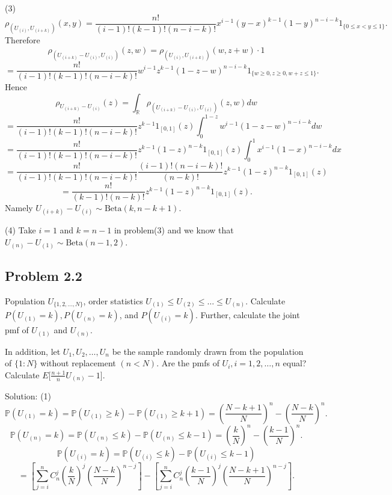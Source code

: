 (3)
\[
\rho_{(U_{(i)},U_{(i+k)})}(x,y)=\frac{n!}{(i-1)!(k-1)!(n-i-k)!}x^{i-1}(y-x)^{k-1}(1-y)^{n-i-k}1_{\{0\leq x<y\leq 1\}}.
\]
Therefore
\[
\rho_{(U_{(i+k)}-U_{(i)},U_{(i)})}(z,w)=\rho_{(U_{(i)},U_{(i+k)})}(w,z+w)\cdot 1
\]
\[
=\frac{n!}{(i-1)!(k-1)!(n-i-k)!}w^{i-1}z^{k-1}(1-z-w)^{n-i-k}1_{\{w\geq 0,z\geq 0,w+z\leq 1\}}.
\]
Hence
\[
\rho_{U_{(i+k)}-U_{(i)}}(z)=\int_{\mathbb{R}}\rho_{(U_{(i+k)}-U_{(i)},U_{(i)})}(z,w)dw
\]
\[
=\frac{n!}{(i-1)!(k-1)!(n-i-k)!}z^{k-1}1_{[0,1]}(z)\int_{0}^{1-z}w^{i-1}(1-z-w)^{n-i-k}dw
\]
\[
=\frac{n!}{(i-1)!(k-1)!(n-i-k)!}z^{k-1}(1-z)^{n-k}1_{[0,1]}(z)\int_{0}^{1}x^{i-1}(1-x)^{n-i-k}dx
\]
\[
=\frac{n!}{(i-1)!(k-1)!(n-i-k)!}\frac{(i-1)!(n-i-k)!}{(n-k)!}z^{k-1}(1-z)^{n-k}1_{[0,1]}(z)
\]
\[
=\frac{n!}{(k-1)!(n-k)!}z^{k-1}(1-z)^{n-k}1_{[0,1]}(z).
\]
Namely $U_{(i+k)}-U_{(i)}\sim\text{Beta}(k,n-k+1)$.

(4) Take $i=1$ and $k=n-1$ in problem(3) and we know that $U_{(n)}-U_{(1)}\sim\text{Beta}(n-1,2)$.

\subsection*{Problem 2.2}
Population $U_{\{1,2,\dots,N\}}$, order statistics $U_{(1)}\leq U_{(2)}\leq\dots\leq U_{(n)}$. Calculate $P(U_{(1)}=k),P(U_{(n)}=k)$, and $P(U_{(i)}=k)$. Further, calculate the joint pmf of $U_{(1)}$ and $U_{(n)}$.

In addition, let $U_{1},U_{2},\dots,U_{n}$ be the sample randomly drawn from the population of $\{1:N\}$ without replacement $(n<N)$. Are the pmfs of $U_{i},i=1,2,\dots,n$ equal? Calculate $E\big[\frac{n+1}{n}U_{(n)}-1\big]$.

{Solution:}
(1)
\[
\mathbb{P}\left(U_{(1)}=k\right)=\mathbb{P}\left(U_{(1)}\geq k\right)-\mathbb{P}\left(U_{(1)}\geq k+1\right)=\left(\frac{N-k+1}{N}\right)^{n}-\left(\frac{N-k}{N}\right)^{n}.
\]
\[
\mathbb{P}\left(U_{(n)}=k\right)=\mathbb{P}\left(U_{(n)}\leq k\right)-\mathbb{P}\left(U_{(n)}\leq k-1\right)=\left(\frac{k}{N}\right)^{n}-\left(\frac{k-1}{N}\right)^{n}.
\]
\[
\mathbb{P}\left(U_{(i)}=k\right)=\mathbb{P}\left(U_{(i)}\leq k\right)-\mathbb{P}\left(U_{(i)}\leq k-1\right)
\]
\[
=\left[\sum_{j=i}^{n}C_{n}^{j}\left(\frac{k}{N}\right)^{j}\left(\frac{N-k}{N}\right)^{n-j}\right]-\left[\sum_{j=i}^{n}C_{n}^{j}\left(\frac{k-1}{N}\right)^{j}\left(\frac{N-k+1}{N}\right)^{n-j}\right].
\]

